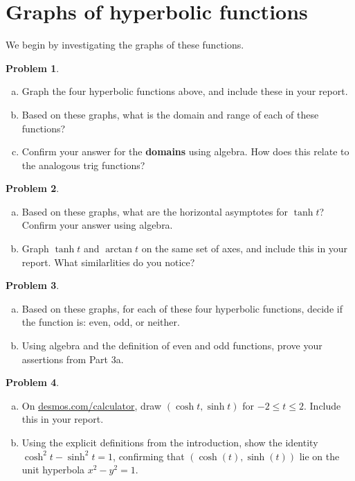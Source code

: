 \documentclass[11pt,reqno,final]{amsart}
\numberwithin{equation}{section}
\numberwithin{figure}{section}
\theoremstyle{definition} %
\newtheorem{question}{Problem}
\begin{document}
\newpage


\section{Graphs of hyperbolic functions}

We begin by investigating the graphs of these functions.

\begin{question}
        $ $
        \begin{enumerate}[(a)]
        \item Graph the four hyperbolic functions above, and include these in your report.
        \item Based on these graphs, what is the domain and range of each of these functions?
        \item Confirm your answer for the \textbf{domains} using algebra.
                How does this relate to the analogous trig functions?
        \end{enumerate}
\end{question}

\begin{question}
        $ $
        \begin{enumerate}[(a)]
        \item Based on these graphs, what are the horizontal asymptotes for $\tanh t$? Confirm your answer using algebra.
        \item Graph $\tanh t$ and $\arctan t$ on the same set of axes, and include this in your report.
                What similarlities do you notice?
        \end{enumerate}
\end{question}

\begin{question}
        $ $
        \begin{enumerate}[(a)]
        \item Based on these graphs, for each of these four hyperbolic functions, decide if the function is: even, odd, or neither.
        \item Using algebra and the definition of even and odd functions, prove your assertions from Part 3a.
        \end{enumerate}
\end{question}

\begin{question}
        $ $
        \begin{enumerate}[(a)]
        \item On \url{desmos.com/calculator}, draw $(\cosh t, \sinh t)$ for $-2 \leq t \leq 2$.
                Include this in your report.
        \item Using the explicit definitions from the introduction, show the identity $\cosh^2 t - \sinh^2 t = 1$,
                confirming that $(\cosh(t),\sinh(t))$ lie on the unit hyperbola $x^2 - y^2 = 1$.
        \end{enumerate}
\end{question}
\vfill
\end{document}
